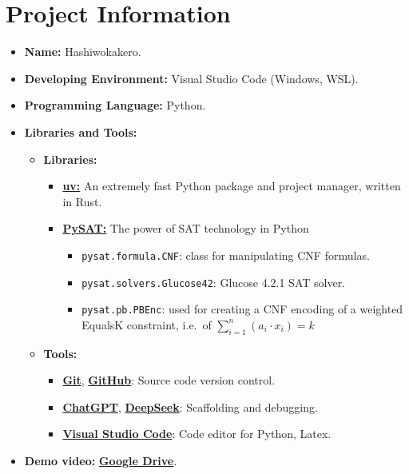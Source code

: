 \section{Project Information}
\begin{itemize}
  \item \textbf{Name:} Hashiwokakero.
  \item \textbf{Developing Environment:} Visual Studio Code (Windows, WSL).
  \item \textbf{Programming Language:} Python.
  \item \textbf{Libraries and Tools:}
        \begin{itemize}
          \item \textbf{Libraries:}
                \begin{itemize}
                  \item \href{https://docs.astral.sh/uv/getting-started/installation/}{\textbf{uv:}} An extremely fast Python package and project manager, written in Rust.
                  \item \href{https://pysathq.github.io/}{\textbf{PySAT:}} The power of SAT technology in Python
                        \begin{itemize}
                          \item \verb|pysat.formula.CNF|: class for manipulating CNF formulas.
                          \item \verb|pysat.solvers.Glucose42|: Glucose 4.2.1 SAT solver.
                          \item \verb|pysat.pb.PBEnc|: used for creating a CNF encoding of a weighted EqualsK constraint, i.e.\ of \(\sum_{i = 1}^{n}(a_i \cdot x_i) = k\)
                        \end{itemize}
                \end{itemize}
          \item \textbf{Tools:}
                \begin{itemize}
                  \item \href{https://git-scm.com/}{\textbf{Git}}, \href{https://github.com/}{\textbf{GitHub}}: Source code version control.
                  \item \href{https://chatgpt.com/}{\textbf{ChatGPT}}, \href{https://chat.deepseek.com/}{\textbf{DeepSeek}}: Scaffolding and debugging.
                  \item \href{https://code.visualstudio.com/}{\textbf{Visual Studio Code}}: Code editor for Python, Latex.
                \end{itemize}
        \end{itemize}
  \item \textbf{Demo video:} \href{https://drive.google.com/file/d/1kuBiLI41jVfF_J9hS3RkgJALv8Ot_QrW/view?usp=drive_link}{\textbf{Google Drive}}.
\end{itemize}
